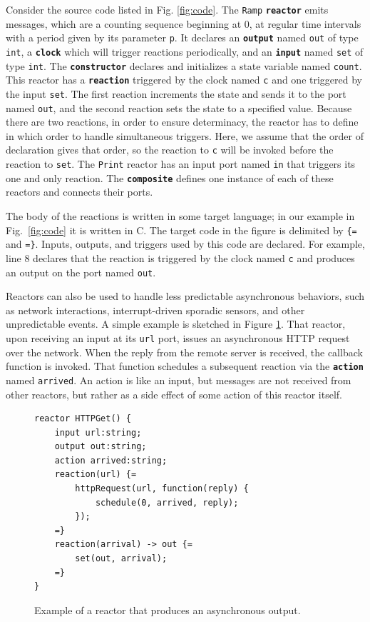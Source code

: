\documentclass[sigconf]{acmart}
\newcommand{\keyword}[1]{\texttt{\textbf{#1}}}
\begin{document}
Consider the source code listed in Fig. \ref{fig:code}. 
The \texttt{Ramp} \keyword{reactor} emits messages, which are a counting sequence beginning at 0, at regular time intervals
with a period given by its parameter \texttt{p}.
It declares an \keyword{output} named \texttt{out} of type \texttt{int}, a
\keyword{clock} which will trigger reactions periodically, and an \keyword{input} named {\tt set} of type {\tt int}.
The \keyword{constructor} declares and initializes a state variable named \texttt{count}.
This reactor has a \keyword{reaction} triggered by the clock named \texttt{c}
and one triggered by the input \texttt{set}.
The first reaction increments the state and sends it to the port named \texttt{out}, and the second reaction
sets the state to a specified value.
Because there are two reactions, in order to ensure determinacy, the reactor has to define in which order to
handle simultaneous triggers.
Here, we assume that the order of declaration gives that order, so the reaction to \texttt{c} will be invoked
before the reaction to \texttt{set}.
The \texttt{Print} reactor has an input port named \texttt{in} that triggers its one and only reaction.
The \keyword{composite} defines one instance of each of these reactors and connects their ports.

The body of the reactions is written in some target language; in our example in Fig.~\ref{fig:code} it is written in C.
The target code in the figure is delimited by {\tt \{=} and {\tt =\}}.
Inputs, outputs, and triggers used by this code are declared.
For example, line 8 declares that the reaction is triggered by the clock named \texttt{c} and
produces an output on the port named \texttt{out}.

Reactors can also be used to handle less predictable asynchronous behaviors,
such as network interactions, interrupt-driven sporadic sensors, and other unpredictable events.
A simple example is sketched in Figure \ref{fig:async}.
That reactor, upon receiving an input at its \texttt{url} port,
issues an asynchronous HTTP request over the network.
When the reply from the remote server is received, the callback function is invoked.
That function schedules a subsequent reaction via the \keyword{action} named \texttt{arrived}.
An action is like an input, but messages are not received from other reactors,
but rather as a side effect of some action of this reactor itself.

\begin{figure}[ht]
\begin{lstlisting}[language=LF]
reactor HTTPGet() {
	input url:string;
	output out:string;
	action arrived:string;
	reaction(url) {=
		httpRequest(url, function(reply) {
			schedule(0, arrived, reply);
		});
	=}
	reaction(arrival) -> out {=
		set(out, arrival);
	=}
}
\end{lstlisting}
 \caption{Example of a reactor that produces an asynchronous output.}
 \label{fig:async}
\end{figure}
\end{document}
